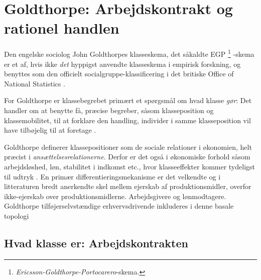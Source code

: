 \section{Goldthorpe: Arbejdskontrakt og rationel handlen \label{kap_klasse_Goldthorpe}}



Den engelske sociolog John Goldthorpes klasseskema, det såkaldte EGP%
%
		\footnote{ \emph{Ericsson-Goldthorpe-Portocarero}-skema.}%
%
-skema er et af, hvis ikke \emph{det} hyppigst anvendte klasseskema i empirisk forskning, og benyttes som den officielt socialgruppe-klassificering i det britiske Office of National Statistics \parencite{RosePevalin2003}. 

For Goldthorpe er klassebegrebet primært et spørgsmål om hvad klasse \emph{gør}: Det handler om at benytte få, præcise begreber, såsom klasseposition og klassemobilitet, til at forklare den handling, individer i samme klasseposition vil have tilbøjelig til at foretage \parencite[382]{GoldthorpeMarshall1992}. 

Goldthorpe definerer klassepositioner som de sociale relationer i økonomien, helt præcist i \emph{ansættelsesrelationerne}. Derfor er det også i økonomiske forhold såsom arbejdsløshed, løn, stabilitet i indkomst etc., hvor klasseeffekter kommer tydeligst til udtryk \parencite[1]{GoldthorpeMcKnight2004}. En primær differentieringsmekanisme er det velkendte og i litteraturen bredt anerkendte skel mellem ejerskab af produktionsmidler, overfor ikke-ejerskab over produktionsmidlerne. Arbejdsgivere og lønmodtagere. Goldthorpe tilføjerselvstændige erhvervsdrivende inkluderes i denne basale topologi %

%
\subsection{Hvad klasse er: Arbejdskontrakten \label{subsec teori klasse goldthorpe arbejdskontrakten}}

